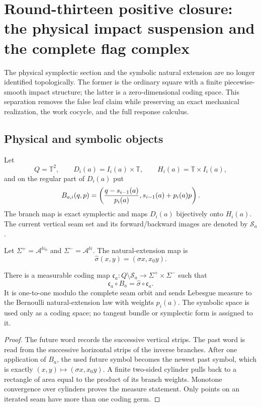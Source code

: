 \section{Round-thirteen positive closure: the physical impact suspension and the complete flag complex}
\label{sec:r13-a1}

The physical symplectic section and the symbolic natural extension are no
longer identified topologically.  The former is the ordinary square with a
finite piecewise-smooth impact structure; the latter is a zero-dimensional
coding space.  This separation removes the false leaf claim while preserving
an exact mechanical realization, the work cocycle, and the full response
calculus.

\subsection{Physical and symbolic objects}

Let
\[
 Q=\mathbb T^2,\qquad D_i(a)=I_i(a)\times\mathbb T,
 \qquad H_i(a)=\mathbb T\times I_i(a),
\]
and on the regular part of $D_i(a)$ put
\[
 B_{a,i}(q,p)=
 \left({q-s_{i-1}(a)\over p_i(a)},
 s_{i-1}(a)+p_i(a)p\right).
\]
The branch map is exact symplectic and maps $D_i(a)$ bijectively onto
$H_i(a)$.  The current vertical seam set and its forward/backward images are
denoted by $\mathscr S_a$.

Let $\Sigma^+=\mathcal A^{\mathbb N_0}$ and
$\Sigma^-=\mathcal A^{\mathbb N}$.  The natural-extension map is
\[
 \widehat\sigma(x,y)=(\sigma x,x_0y).
\]

\begin{theorem}
\label{thm:r13-a1-factor}
There is a measurable coding map
$\mathfrak c_a:Q\setminus\mathscr S_a\to\Sigma^+\times\Sigma^-$ such that
\[
 \mathfrak c_a\circ B_a=\widehat\sigma\circ\mathfrak c_a.
\]
It is one-to-one modulo the complete seam orbit and sends Lebesgue measure to
the Bernoulli natural-extension law with weights $p_i(a)$.  The symbolic
space is used only as a coding space; no tangent bundle or symplectic form is
assigned to it.
\end{theorem}

\begin{proof}
The future word records the successive vertical strips.  The past word is
read from the successive horizontal strips of the inverse branches.  After
one application of $B_a$, the used future symbol becomes the newest past
symbol, which is exactly $(x,y)\mapsto(\sigma x,x_0y)$.  A finite two-sided
cylinder pulls back to a rectangle of area equal to the product of its branch
weights.  Monotone convergence over cylinders proves the measure statement.
Only points on an iterated seam have more than one coding germ.
\end{proof}

